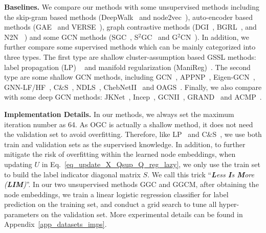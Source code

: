 \textbf{Baselines.}
We compare our methods with some unsupervised methods including the skip-gram based methods (DeepWalk~\citep{perozzi_2014_kdd} and node2vec~\citep{grover2016node2vec}), auto-encoder based methods (GAE~\citep{kipf_2016_arxiv} and  VERSE~\citep{tsitsulin_2018_www}), graph contrastive methods (DGI~\citep{velickovic_2019_iclr}, BGRL~\citep{thakoor2022large}, and N2N~\citep{dong2022node} ) and some GCN methods (SGC~\citep{wu2019simplifying}, S$^2$GC~\citep{zhusimple2021} and G$^2$CN~\citep{li2022g}).
In addition, we further compare some supervised methods which can be mainly categorized into three types.
The first type are shallow cluster-assumption based GSSL methods: label propagation (LP) ~\citep{zhu_2003_icml} and manifold regularization (ManiReg)~\citep{belkin2006manifold}.
The second type are some shallow GCN methods, including GCN~\citep{kipf_2017_iclr}, APPNP~\citep{klicpera2018predict}, Eigen-GCN~\citep{zhang2021eigen}, GNN-LF/HF~\citep{zhu2021interpreting}, C\&S~\citep{huang2020combining}, NDLS~\citep{zhang2021node}, ChebNetII~\citep{he2022convolutional} and OAGS~\citep{song2022towards}.
Finally, we also compare with some deep GCN methods: JKNet~\citep{xu2018representation}, Incep~\citep{rong2019dropedge}, GCNII~\citep{chen2020simple}, GRAND~\citep{feng2020graph} and ACMP~\citep{wang2023acmp}.


\textbf{Implementation Details.}
In our methods, we always set the maximum iteration number as 64.
As OGC is actually a shallow method, it does not need the validation set to avoid overfitting.
Therefore, like LP~\citep{zhu_2003_icml} and C\&S~\citep{huang2020combining}, we use both train and validation sets as the supervised knowledge.
In addition, to further mitigate the risk of overfitting within the learned node embeddings, when updating $U$ in Eq.~\ref{eq_update_X_Qsup_Q_reg_lazy}, we only use the train set to build the label indicator diagonal matrix $S$.
We call this trick ``\emph{\textbf{L}ess \textbf{I}s \textbf{M}ore (\textbf{LIM})}''.
In our two unsupervised methods GGC and GGCM, after obtaining the node embeddings, we train a linear logistic regression classifier for label prediction on the training set, and conduct a grid search to tune all hyper-parameters on the validation set.
More experimental details can be found in Appendix~\ref{app_datasets_imps}.


\vspace{-5pt}
